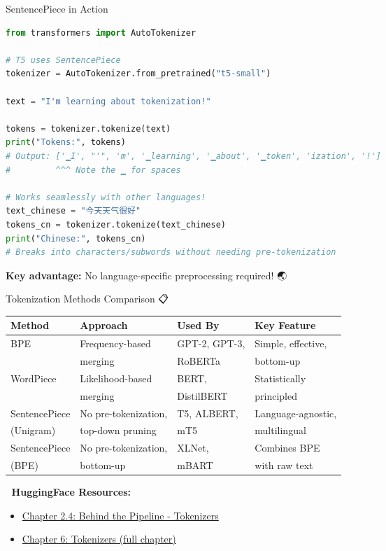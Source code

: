 \documentclass[aspectratio=169]{beamer}
\begin{document}
\begin{frame}[fragile]{SentencePiece in Action 🚀}
    \begin{lstlisting}[language=Python]
from transformers import AutoTokenizer

# T5 uses SentencePiece
tokenizer = AutoTokenizer.from_pretrained("t5-small")

text = "I'm learning about tokenization!"

tokens = tokenizer.tokenize(text)
print("Tokens:", tokens)
# Output: ['▁I', "'", 'm', '▁learning', '▁about', '▁token', 'ization', '!']
#         ^^^ Note the ▁ for spaces

# Works seamlessly with other languages!
text_chinese = "今天天气很好"
tokens_cn = tokenizer.tokenize(text_chinese)
print("Chinese:", tokens_cn)
# Breaks into characters/subwords without needing pre-tokenization
    \end{lstlisting}

    \vspace{0.5em}
    \textbf{Key advantage:} No language-specific preprocessing required! 🌏
\end{frame}

\begin{frame}{Tokenization Methods Comparison 📋}
    \begin{table}
        \centering
        \small
        \begin{tabular}{lllp{3.5cm}}
            \toprule
            \textbf{Method} & \textbf{Approach} & \textbf{Used By} & \textbf{Key Feature} \\
            \midrule
            BPE & Frequency-based & GPT-2, GPT-3, & Simple, effective, \\
            & merging & RoBERTa & bottom-up \\
            \midrule
            WordPiece & Likelihood-based & BERT, & Statistically \\
            & merging & DistilBERT & principled \\
            \midrule
            SentencePiece & No pre-tokenization, & T5, ALBERT, & Language-agnostic, \\
            (Unigram) & top-down pruning & mT5 & multilingual \\
            \midrule
            SentencePiece & No pre-tokenization, & XLNet, & Combines BPE \\
            (BPE) & bottom-up & mBART & with raw text \\
            \bottomrule
        \end{tabular}
    \end{table}

    \vspace{0.5em}
    📖 \textbf{HuggingFace Resources:}
    \begin{itemize}\setlength{\itemsep}{0pt}
        \item \href{https://huggingface.co/learn/nlp-course/chapter2/4}{Chapter 2.4: Behind the Pipeline - Tokenizers}
        \item \href{https://huggingface.co/learn/nlp-course/chapter6}{Chapter 6: Tokenizers (full chapter)}
    \end{itemize}
\end{frame}
\end{document}
